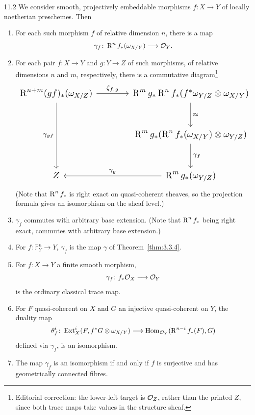 \begin{bookcorollary}{11.2}\label{cor:3.11.2}
We consider smooth, projectively embeddable morphisms $f\colon X\to Y$ of locally noetherian preschemes. Then
\begin{enumerate}
\item[a)] For each such morphism $f$ of relative dimension $n$, there is a map
\[
\gamma_f \colon \operatorname{R}^n f_*(\omega_{X/Y}) \longrightarrow \mathcal{O}_Y.
\]
\item[b)] For each pair $f\colon X\to Y$ and $g\colon Y\to Z$ of such morphisms, of relative dimensions $n$ and $m$, respectively, there is a commutative diagram\footnote{Editorial correction: the lower-left target is $\mathcal{O}_Z$, rather than the printed $Z$, since both trace maps take values in the structure sheaf.}
	\[
	\resizebox{\linewidth}{!}{\begin{tikzcd}[ampersand replacement=\&, row sep=large, column sep=large]
		\RR^{n+m}(gf)_*(\omega_{X/Z}) \arrow[r, "\zeta_{f,g}"] \arrow[dd, "\gamma_{gf}"']
		\& \RR^m g_* \RR^n f_*(f^* \omega_{Y/Z} \otimes \omega_{X/Y}) \arrow[d, "\approx"] \\
		\& \RR^m g_*(\RR^n f_*(\omega_{X/Y}) \otimes \omega_{Y/Z}) \arrow[d, "\gamma_f"] \\
		Z
		\& \RR^m g_*(\omega_{Y/Z}) \arrow[l, "\gamma_g"']
	\end{tikzcd}}
	\]
(Note that $\operatorname{R}^n f_*$ is right exact on quasi-coherent sheaves, so the projection formula gives an isomorphism on the sheaf level.)
\item[c)] $\gamma_f$ commutes with arbitrary base extension. (Note that $\operatorname{R}^n f_*$ being right exact, commutes with arbitrary base extension.)
\item[d)] For $f\colon\mathbb{P}^n_Y\to Y$, $\gamma_f$ is the map $\gamma$ of Theorem~\ref{thm:3.3.4}.
\item[e)] For $f\colon X\to Y$ a finite smooth morphism,
\[
\gamma_f \colon f_*\mathcal{O}_X \longrightarrow \mathcal{O}_Y
\]
is the ordinary classical trace map.
\item[f)] For $F$ quasi-coherent on $X$ and $G$ an injective quasi-coherent on $Y$, the duality map
\[
\theta_f^i \colon \operatorname{Ext}_X^i(F, f^*G\otimes\omega_{X/Y}) \longrightarrow \operatorname{Hom}_{\mathcal{O}_Y}(\operatorname{R}^{n-i}f_*(F), G)
\]
defined via $\gamma_f$, is an isomorphism.
\item[g)] The map $\gamma_f$ is an isomorphism if and only if $f$ is surjective and has geometrically connected fibres.
\end{enumerate}
\end{bookcorollary}

